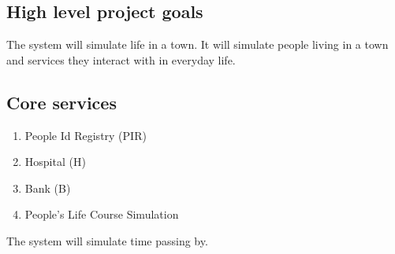 \subsection{High level project goals} 
The system will simulate life in a town. It will simulate people living in a town and services they interact with in everyday life. 

\subsection{Core services} 
\begin{enumerate}
\item People Id Registry (PIR)
\item Hospital (H)
\item Bank (B)
\item People's Life Course Simulation
\end{enumerate}
The system will simulate time passing by.

